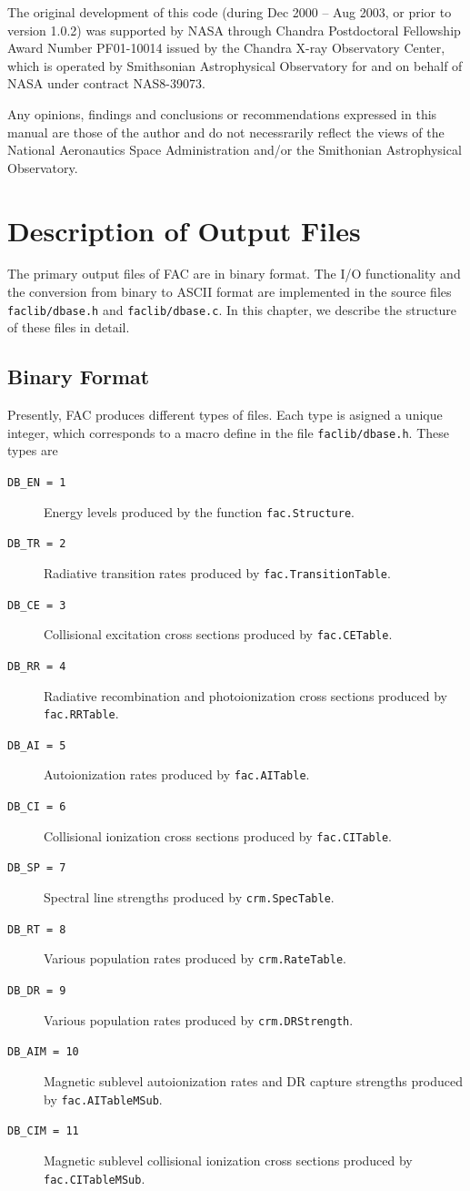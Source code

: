 \documentclass[twoside,letterpaper]{refrep}
\begin{document}
The original development of this code (during Dec 2000 -- Aug 2003, or prior
to version 1.0.2) was
supported by NASA through Chandra Postdoctoral Fellowship Award Number
PF01-10014 issued by the Chandra X-ray Observatory Center, which is operated
by Smithsonian Astrophysical Observatory for and on behalf of NASA under
contract NAS8-39073. 

Any opinions, findings and conclusions or
recommendations expressed in this manual are those of the author and do not
necessrarily reflect the views of the National Aeronautics Space
Administration and/or the Smithonian Astrophysical Observatory.

\chapter{Description of Output Files}
\label{cha:format}
The primary output files of FAC are in binary format. The I/O functionality
and the conversion from binary to ASCII format are implemented in the source
files \verb|faclib/dbase.h| and \verb|faclib/dbase.c|. In this chapter, we
describe the structure of these files in detail.

\section{Binary Format}
\label{sec:binary}
Presently, FAC produces different types of files. Each type is asigned
a unique integer, which corresponds to a macro define in the file
\verb|faclib/dbase.h|. These types are
\begin{description}
\item[\texttt{DB\_EN = 1}] Energy levels produced by the function
\verb|fac.Structure|. 
\item[\texttt{DB\_TR = 2}] Radiative transition rates produced by
\verb|fac.TransitionTable|.
\item[\texttt{DB\_CE = 3}] Collisional excitation cross sections produced by
\verb|fac.CETable|. 
\item[\texttt{DB\_RR = 4}] Radiative recombination and photoionization cross
sections produced by \verb|fac.RRTable|.
\item[\texttt{DB\_AI = 5}] Autoionization rates produced by \verb|fac.AITable|.
\item[\texttt{DB\_CI = 6}] Collisional ionization cross sections produced by
\verb|fac.CITable|. 
\item[\texttt{DB\_SP = 7}] Spectral line strengths produced by
\verb|crm.SpecTable|. 
\item[\texttt{DB\_RT = 8}] Various population rates produced by
\verb|crm.RateTable|. 
\item[\texttt{DB\_DR = 9}] Various population rates produced by
\verb|crm.DRStrength|.
\item[\texttt{DB\_AIM = 10}] Magnetic sublevel autoionization rates and DR
capture strengths produced by \verb|fac.AITableMSub|.
\item[\texttt{DB\_CIM = 11}] Magnetic sublevel collisional ionization cross
  sections produced by \verb|fac.CITableMSub|.
\end{description}
\end{document}
